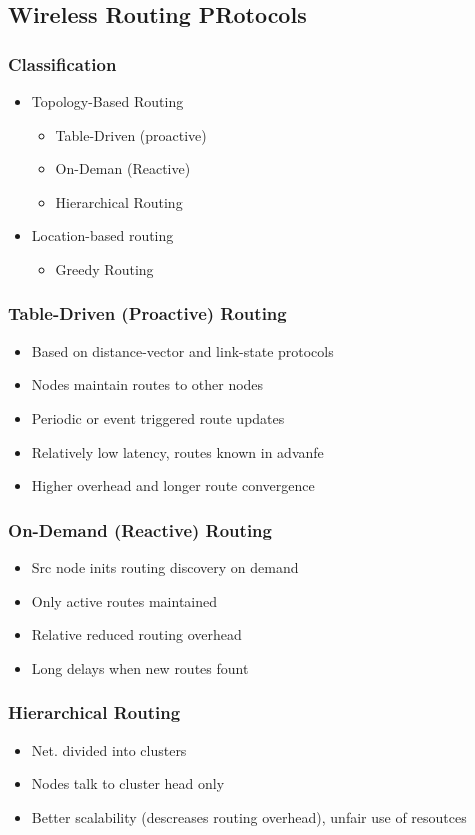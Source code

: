 \subsection{Wireless Routing PRotocols}
\subsubsection{Classification}
\begin{itemize}
	\item Topology-Based Routing
	\begin{itemize}
		\item Table-Driven (proactive)
		\item On-Deman (Reactive)
		\item Hierarchical Routing
	\end{itemize}
	\item Location-based routing
	\begin{itemize}
		\item Greedy Routing
	\end{itemize}
\end{itemize}
\subsubsection{Table-Driven (Proactive) Routing}
\begin{itemize}
	\item Based on distance-vector and link-state protocols
	\item Nodes maintain routes to other nodes
	\item Periodic or event triggered route updates
	\item Relatively low latency, routes known in advanfe
	\item Higher overhead and longer route convergence
\end{itemize}
\subsubsection{On-Demand (Reactive) Routing}
\begin{itemize}
	\item Src node inits routing discovery on demand
	\item Only active routes maintained
	\item Relative reduced routing overhead
	\item Long delays when new routes fount
\end{itemize}
\subsubsection{Hierarchical Routing}
\begin{itemize}
	\item Net. divided into clusters
	\item Nodes talk to cluster head only
	\item Better scalability (descreases routing overhead), unfair use of
		resoutces
\end{itemize}
